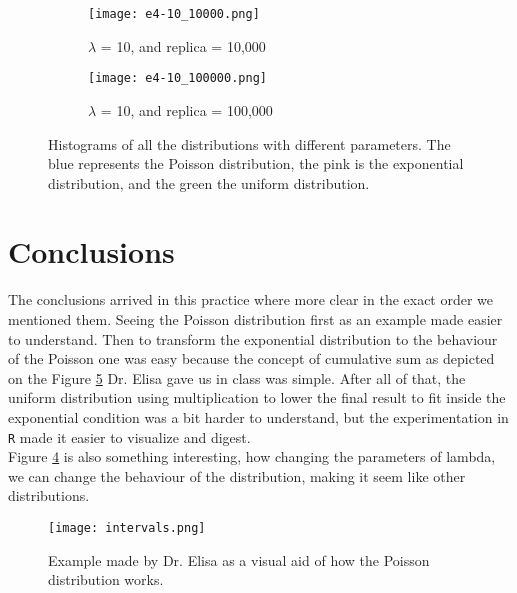 \documentclass{article}
\begin{document}
\begin{figure}[]
\begin{subfigure}{.33\textwidth}
  \label{subfig5-7}
\end{subfigure}
\begin{subfigure}{.33\textwidth}
  \centering
  \texttt{[image: e4-10\_10000.png]}  
  \caption{$\lambda$ = 10, and replica = 10,000}
  \label{subfig5-8}
\end{subfigure}
\begin{subfigure}{.33\textwidth}
  \centering
  \texttt{[image: e4-10\_100000.png]}  
  \caption{$\lambda$ = 10, and replica = 100,000}
  \label{subfig5-9}
\end{subfigure}
\caption{Histograms of all the distributions with different parameters. The blue represents the Poisson distribution, the pink is the exponential distribution, and the green the uniform distribution. }
\label{fig5}
\end{figure}




\clearpage
\section{Conclusions}

The conclusions arrived in this practice where more clear in the exact order we mentioned them. Seeing the Poisson distribution first as an example made easier to understand. Then to transform the exponential distribution to the behaviour of the Poisson one was easy because the concept of cumulative sum as depicted on the Figure \ref{figelisa} Dr. Elisa gave us in class was simple. After all of that, the uniform distribution using multiplication to lower the final result to fit inside the exponential condition was a bit harder to understand, but the experimentation in \texttt{R} made it easier to visualize and digest.\\

Figure \ref{fig5} is also something interesting, how changing the parameters of lambda, we can change the behaviour of the distribution, making it seem like other distributions.\\

\begin{figure}[]
  \centering
  \texttt{[image: intervals.png]}  
  \caption{Example made by Dr. Elisa as a visual aid of how the Poisson distribution works.}
  \label{figelisa}
\end{figure}






 
\end{document}
